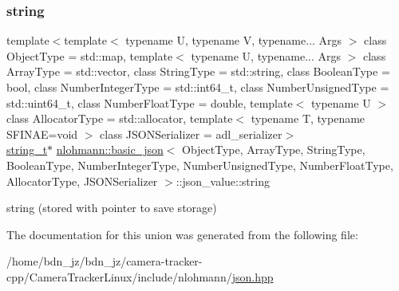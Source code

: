 \subsubsection{\texorpdfstring{string}{string}}
{\footnotesize\ttfamily template$<$template$<$ typename U, typename V, typename... Args $>$ class Object\+Type = std\+::map, template$<$ typename U, typename... Args $>$ class Array\+Type = std\+::vector, class String\+Type  = std\+::string, class Boolean\+Type  = bool, class Number\+Integer\+Type  = std\+::int64\+\_\+t, class Number\+Unsigned\+Type  = std\+::uint64\+\_\+t, class Number\+Float\+Type  = double, template$<$ typename U $>$ class Allocator\+Type = std\+::allocator, template$<$ typename T, typename S\+F\+I\+N\+A\+E=void $>$ class J\+S\+O\+N\+Serializer = adl\+\_\+serializer$>$ \\
\hyperlink{classnlohmann_1_1basic__json_a61f8566a1a85a424c7266fb531dca005}{string\+\_\+t}$\ast$ \hyperlink{classnlohmann_1_1basic__json}{nlohmann\+::basic\+\_\+json}$<$ Object\+Type, Array\+Type, String\+Type, Boolean\+Type, Number\+Integer\+Type, Number\+Unsigned\+Type, Number\+Float\+Type, Allocator\+Type, J\+S\+O\+N\+Serializer $>$\+::json\+\_\+value\+::string}



string (stored with pointer to save storage) 



The documentation for this union was generated from the following file\+:\begin{DoxyCompactItemize}
\item 
/home/bdn\+\_\+jz/bdn\+\_\+jz/camera-\/tracker-\/cpp/\+Camera\+Tracker\+Linux/include/nlohmann/\hyperlink{json_8hpp}{json.\+hpp}\end{DoxyCompactItemize}
